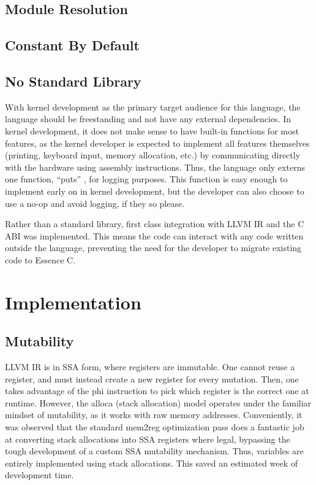 \documentclass[12pt,a4paper,twoside]{report}
\begin{document}
\subsection{Module Resolution}

\subsection{Constant By Default}

\subsection{No Standard Library}

With kernel development as the primary target audience for this language, the language should be freestanding and not have any external dependencies. In kernel development, it does not make sense to have built-in functions for most features, as the kernel developer is expected to implement all features themselves (printing, keyboard input, memory allocation, etc.) by communicating directly with the hardware using assembly instructions. Thus, the language only externs one function, ``puts'' , for logging purposes. This function is easy enough to implement early on in kernel development, but the developer can also choose to use a no-op and avoid logging, if they so please.

Rather than a standard library, first class integration with LLVM IR and the C ABI was implemented. This means the code can interact with any code written outside the language, preventing the need for the developer to migrate existing code to Essence C.

\section{Implementation}

\subsection{Mutability}

LLVM IR is in SSA form, where registers are immutable. One cannot reuse a register, and must instead create a new register for every mutation. Then, one takes advantage of the phi instruction to pick which register is the correct one at runtime. However, the alloca (stack allocation) model operates under the familiar mindset of mutability, as it works with raw memory addresses. Conveniently, it was observed that the standard mem2reg optimization pass does a fantastic job at converting stack allocations into SSA registers where legal, bypassing the tough development of a custom SSA mutability mechanism. Thus, variables are entirely implemented using stack allocations. This saved an estimated week of development time.
\end{document}
